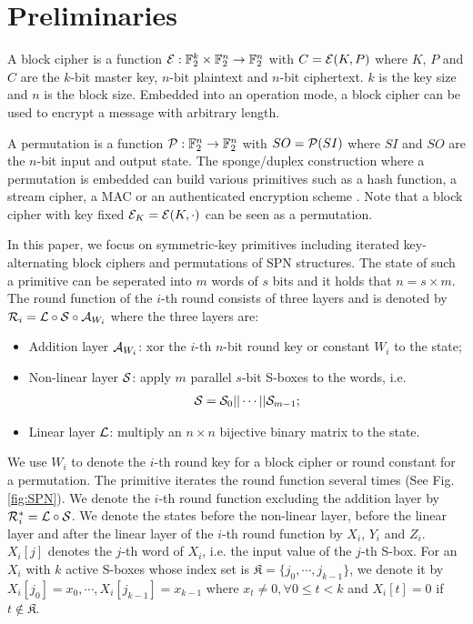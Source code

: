 \section{Preliminaries\label{sec:pre}}

A block cipher is a function $\mathcal{E}:\mathbb{F}_2^k \times \mathbb{F}_2^n \rightarrow \mathbb{F}_2^n$ with $C=\mathcal{E}(K,P)$ where $K$, $P$ and $C$ are the $k$-bit master key, $n$-bit plaintext and $n$-bit ciphertext. $k$ is the key size and $n$ is the block size. Embedded into an operation mode, a block cipher can be used to encrypt a message with arbitrary length. 

A permutation is a function $\mathcal{P}:\mathbb{F}_2^n \rightarrow \mathbb{F}_2^n$ with $SO=\mathcal{P}(SI)$ where $SI$ and $SO$ are the $n$-bit input and output state. The sponge/duplex construction where a permutation is embedded can build various primitives such as a hash function, a stream cipher, a MAC or an authenticated encryption scheme \cite{bertoni2007sponge}. Note that a block cipher with key fixed $\mathcal{E}_K=\mathcal{E}(K,\cdot)$ can be seen as a permutation.

In this paper, we focus on symmetric-key primitives including iterated key-alternating block ciphers and permutations of SPN structures. The state of such a primitive can be seperated into $m$ words of $s$ bits and it holds that $n=s\times m$. The round function of the $i$-th round consists of three layers and is denoted by $\mathcal{R}_i=\mathcal{L}\circ\mathcal{S}\circ\mathcal{A}_{W_i}$ where the three layers are:
\begin{itemize}
    \item Addition layer $\mathcal{A}_{W_i}$: xor the $i$-th $n$-bit round key or constant $W_i$ to the state;
    \item Non-linear layer $\mathcal{S}$: apply $m$ parallel $s$-bit S-boxes to the words, i.e.
    \begin{align*}
        \mathcal{S}=\mathcal{S}_0||\cdots||\mathcal{S}_{m-1};
    \end{align*}
    \item Linear layer $\mathcal{L}$: multiply an $n\times n$ bijective binary matrix to the state. 
\end{itemize}

We use $W_i$ to denote the $i$-th round key for a block cipher or round constant for a permutation. The primitive iterates the round function several times (See Fig. \ref{fig:SPN}). We denote the $i$-th round function excluding the addition layer by $\mathcal{R}_i^*=\mathcal{L}\circ\mathcal{S}$. We denote the states before the non-linear layer, before the linear layer and after the linear layer of the $i$-th round function by $X_i$, $Y_i$ and $Z_i$. $X_i[j]$ denotes the $j$-th word of $X_i$, i.e. the input value of the $j$-th S-box. For an $X_i$ with $k$ active S-boxes whose index set is $\mathfrak{K}=\{j_0,\cdots,j_{k-1}\}$, we denote it by $X_i[j_0]=x_0,\cdots,X_i[j_{k-1}]=x_{k-1}$ where $x_t\neq 0,\forall 0\leq t<k$ and $X_i[t]=0$ if $t\notin \mathfrak{K}$.


